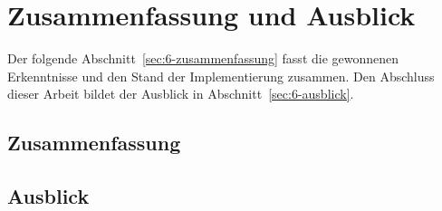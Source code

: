 % 
% 
% 
% 
% 
% 
% 

\section{Zusammenfassung und Ausblick%
  \label{sec:6-fazit}}
Der folgende Abschnitt~\ref{sec:6-zusammenfassung} fasst die gewonnenen Erkenntnisse und den Stand der Implementierung zusammen.
Den Abschluss dieser Arbeit bildet der Ausblick in Abschnitt~\ref{sec:6-ausblick}.

\subsection{Zusammenfassung%
     \label{sec:6-zusammenfassung}}

\subsection{Ausblick%
     \label{sec:6-ausblick}}
